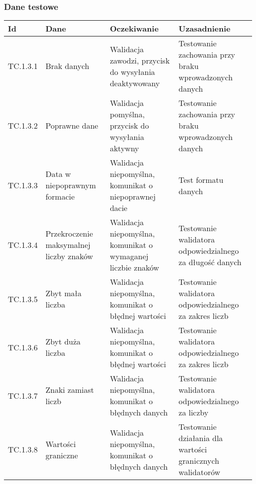 \documentclass[a4paper,15pt]{article}
\begin{document}
\begin{framed}
\newpage
\subsubsection{Dane testowe}

\begin{center}
\begin{tabular}{ |C{1.5cm}|C{3cm}|C{4cm}|C{4cm}| } 
 \hline
 \textbf{Id} & \textbf{Dane} & \textbf{Oczekiwanie} & \textbf{Uzasadnienie} \\ \hline
 TC.1.3.1 & Brak danych & Walidacja zawodzi, przycisk do wysyłania deaktywowany & Testowanie zachowania przy braku wprowadzonych danych \\ \hline
 TC.1.3.2 & Poprawne dane & Walidacja pomyślna, przycisk do wysyłania aktywny & Testowanie zachowania przy braku wprowadzonych danych \\ \hline
 TC.1.3.3 & Data w niepoprawnym formacie & Walidacja niepomyślna, komunikat o niepoprawnej dacie & Test formatu danych \\ \hline
 TC.1.3.4 & Przekroczenie maksymalnej liczby znaków & Walidacja niepomyślna, komunikat o wymaganej liczbie znaków & Testowanie walidatora odpowiedzialnego za długość danych \\ \hline
 TC.1.3.5 & Zbyt mała liczba & Walidacja niepomyślna, komunikat o błędnej wartości & Testowanie walidatora odpowiedzialnego za zakres liczb \\ \hline
 TC.1.3.6 & Zbyt duża liczba & Walidacja niepomyślna, komunikat o błędnej wartości & Testowanie walidatora odpowiedzialnego za zakres liczb \\ \hline
 TC.1.3.7 & Znaki zamiast liczb & Walidacja niepomyślna, komunikat o błędnych danych & Testowanie walidatora odpowiedzialnego za liczby \\ \hline
 TC.1.3.8 & Wartości graniczne & Walidacja niepomyślna, komunikat o błędnych danych & Testowanie działania dla wartości granicznych walidatorów \\ \hline
\end{tabular}
\end{center}

\end{framed}
\end{document}
